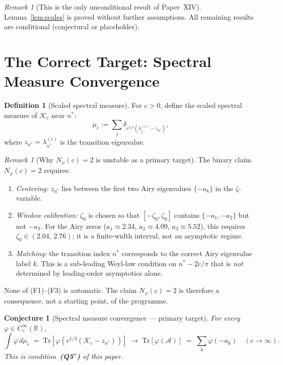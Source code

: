 \documentclass[12pt,a4paper]{amsart}
\newtheorem{conjecture}[theorem]{Conjecture}
\theoremstyle{definition}
\newtheorem{definition}[theorem]{Definition}
\theoremstyle{remark}
\newtheorem{remark}[theorem]{Remark}
\newcommand{\Kc}{\mathcal{K}_c}
\newcommand{\Tr}{\mathrm{Tr}}
\newcommand{\lam}[2]{\lambda_{#2}^{(#1)}}
\newcommand{\cA}{\mathcal{A}}
\newcommand{\R}{\mathbb{R}}
\begin{document}
\begin{remark}[This is the only unconditional result of Paper~XIV]
Lemma~\ref{lem:scales} is proved without further assumptions.
All remaining results are conditional (conjectural or placeholder).
\end{remark}

\section{The Correct Target: Spectral Measure Convergence}
\label{sec:target}

\begin{definition}[Scaled spectral measure]
\label{def:specmeas}
For $c > 0$, define the scaled spectral measure of $\Kc$ near $n^*$:
\begin{equation}\label{eq:specmeas}
 \mu_c := \sum_j \delta_{c^{1/3}(\lam{c}{j} - z_{n^*})},
\end{equation}
where $z_{n^*} = \lam{c}{n^*}$ is the transition eigenvalue.
\end{definition}

\begin{remark}[Why $N_\varphi(c)=2$ is unstable as a primary target]
\label{rem:fragility}
The binary claim $N_\varphi(c) = 2$ requires:
\begin{enumerate}[nosep,label=(F\arabic*)]
 \item \emph{Centering:} $z_{n^*}$ lies between the first two Airy
 eigenvalues $\{-a_k\}$ in the $\zeta$-variable.
 \item \emph{Window calibration:} $\zeta_0$ is chosen so that
 $[-\zeta_0,\zeta_0]$ contains $\{-a_1,-a_2\}$ but not $-a_3$.
 For the Airy zeros ($a_1\approx 2.34$, $a_2\approx 4.09$,
 $a_3\approx 5.52$), this requires $\zeta_0 \in (2.04,\,2.76)$;
 it is a finite-width interval, not an asymptotic regime.
 \item \emph{Matching:} the transition index $n^*$ corresponds to the
 correct Airy eigenvalue label $k$.
 This is a sub-leading Weyl-law condition on $n^* - 2c/\pi$
 that is \emph{not} determined by leading-order asymptotics alone.
\end{enumerate}
None of (F1)--(F3) is automatic.
The claim $N_\varphi(c)=2$ is therefore a consequence,
not a starting point, of the programme.
\end{remark}

\begin{conjecture}[Spectral measure convergence --- primary target]
\label{conj:specmeas}
For every $\varphi \in C_c^\infty(\R)$,
\begin{equation}\label{eq:Q5pp}
 \int \varphi\,d\mu_c
 \;=\; \Tr[\varphi(c^{1/3}(\Kc - z_{n^*}))]
 \;\longrightarrow\;
 \Tr[\varphi(\cA)]
 \;=\; \sum_k \varphi(-a_k)
 \quad (c\to\infty).
\end{equation}
This is condition~\textbf{(Q5$''$)} of this paper.
\end{conjecture}
\end{document}
